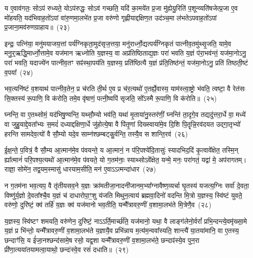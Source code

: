 य ए॒वाव॑गतः॒ सो\-ऽप॑ रुध्यते॒ यो\-ऽप॑रुद्धः॒ सो\-ऽव॑ गच्छति॒ यदि॑ का॒मये॑त प्र॒जा मु॑ह्येयु॒रिति॑ प॒शून्व्यति॑षजेत्प्र॒जा ए॒व मो॑हयति॒ यद॑भिवाह॒तो॑\-ऽपां वा॑रु॒णमा॒लभे॑त प्र॒जा वरु॑णो गृह्णीयाद्दक्षिण॒त उद॑ञ्च॒मा ल॑भते\-ऽपवाह॒तो॑\-ऽ\-पां प्र॒जाना॒मव॑रुणग्राहाय॥~(२३)\ip

{\anuvakamend[{रेतो॒ यज॑माने दधाति लो॒क ऐ॒न्द्रꣳ स॒प्तत्रिꣳ॑शच्च}]}

इन्द्रः॒ पत्नि॑या॒ मनु॑मयाजय॒त्तां पर्य॑ग्निकृता॒मुद॑सृज॒त्तया॒ मनु॑रार्ध्नो॒द्यत्पर्य॑ग्निकृतं पात्नीव॒तमु॑थ्सृ॒जति॒ यामे॒व मनु॒र्॒\mbox{}ऋद्धि॒\-मार्ध्नो॒त्तामे॒व यज॑मान ऋध्नोति य॒ज्ञस्य॒ वा अप्र॑तिष्ठिताद्य॒ज्ञः परा॑ भवति य॒ज्ञं प॑रा॒भव॑न्तं॒ यज॑मा॒नो\-ऽनु॒ परा॑ भवति॒ यदाज्ये॑न पात्नीव॒तꣳ सꣴ॑स्था॒पय॑ति य॒ज्ञस्य॒ प्रति॑ष्ठित्यै य॒ज्ञं प्र॑ति॒तिष्ठ॑न्तं॒ यज॑मा॒नो\-ऽनु॒ प्रति॑ तिष्ठती॒ष्टं व॒पया᳚~(२४)\ip

भव॒त्यनि॑ष्टं व॒शयाथ॑ पात्नीव॒तेन॒ प्र च॑रति ती॒र्थ ए॒व प्र च॑र॒त्यथो॑ ए॒तर्\mbox{}ह्ये॒वास्य॒ याम॑स्त्वा॒ष्ट्रो भ॑वति॒ त्वष्टा॒ वै रेत॑सः सि॒क्तस्य॑ रू॒पाणि॒ वि क॑रोति॒ तमे॒व वृ॑षाणं॒ पत्नी॒ष्वपि॑ सृजति॒ सो᳚\-ऽस्मै रू॒पाणि॒ वि क॑रोति॥~(२५)\ip

{\anuvakamend[{व॒पया॒ षट्त्रिꣳ॑शच्च}]}

घ्नन्ति॒ वा ए॒तथ्सोमं॒ यद॑भिषु॒ण्वन्ति॒ यथ्सौ॒म्यो भव॑ति॒ यथा॑ मृ॒ताया॑नु॒स्तर॑णीं॒ घ्नन्ति॑ ता॒दृगे॒व तद्यदु॑त्तरा॒र्धे वा॒ मध्ये॑ वा जुहु॒याद्दे॒वता᳚भ्यः स॒मदं॑ दध्याद्दक्षिणा॒र्धे जु॑होत्ये॒षा वै पि॑तृ॒णां दिख्स्वाया॑मे॒व दि॒शि पि॒तॄन्नि॒रव॑दयत उद्गा॒तृभ्यो॑ हरन्ति सामदेव॒त्यो॑ वै सौ॒म्यो यदे॒व साम्न॑श्छम्बट्कु॒र्वन्ति॒ तस्यै॒व स शान्ति॒रव॑~(२६)\ip

ई॒क्ष॒न्ते॒ प॒वित्रं॒ वै सौ॒म्य आ॒त्मान॑मे॒व प॑वयन्ते॒ य आ॒त्मानं॒ न प॑रि॒पश्ये॑दि॒तासुः॑ स्यादभिद॒दिं कृ॒त्वावे᳚क्षेत॒ तस्मि॒न् ह्या᳚त्मानं॑ परि॒पश्य॒त्यथो॑ आ॒त्मान॑मे॒व प॑वयते॒ यो ग॒तम॑नाः॒ स्याथ्सो\-ऽवे᳚क्षेत॒ यन्मे॒ मनः॒ परा॑गतं॒ यद्वा॑ मे॒ अप॑रागतम्। राज्ञा॒ सोमे॑न॒ तद्व॒यम॒स्मासु॑ धारयाम॒सीति॒ मन॑ ए॒वा\-ऽऽ\-त्मन्दा॑धार~(२७)\ip

न ग॒तम॑ना भव॒त्यप॒ वै तृ॑तीय\-सव॒ने य॒ज्ञः क्रा॑मतीजा॒नादनी॑जानम॒भ्या᳚ग्नावैष्ण॒व्यर्चा घृ॒तस्य॑ यजत्य॒ग्निः सर्वा॑ दे॒वता॒ विष्णु॑र्य॒ज्ञो दे॒वता᳚श्चै॒व य॒ज्ञं च॑ दाधारोपा॒ꣳ॒शु य॑जति मिथुन॒त्वाय॑ ब्रह्मवा॒दिनो॑ वदन्ति मि॒त्रो य॒ज्ञस्य॒ स्वि॑ष्टं युवते॒ वरु॑णो॒ दुरि॑ष्टं॒ क्व॑ तर्\mbox{}हि॑ य॒ज्ञः क्व॑ यज॑मानो भव॒तीति॒ यन्मै᳚त्रावरु॒णीं व॒शामा॒लभ॑ते मि॒त्रेणै॒व~(२८)\ip

य॒ज्ञस्य॒ स्वि॑ष्टꣳ शमयति॒ वरु॑णेन॒ दुरि॑ष्टं॒ नाऽऽर्ति॒मार्च्छ॑ति॒ यज॑मानो॒ यथा॒ वै लाङ्ग॑लेनो॒र्वरां᳚ प्रभि॒न्दन्त्ये॒वमृ॑ख्सा॒मे य॒ज्ञं प्र भि॑न्तो॒ यन्मै᳚त्रावरु॒णीं व॒शामा॒लभ॑ते य॒ज्ञायै॒व प्रभि॑न्नाय म॒त्य॑म॒न्ववा᳚स्यति॒ शान्त्यै॑ या॒तया॑मानि॒ वा ए॒तस्य॒ छन्दाꣳ॑सि॒ य ई॑जा॒नश्छन्द॑सामे॒ष रसो॒ यद्व॒शा यन्मै᳚त्रावरु॒णीं व॒शामा॒लभ॑ते॒ छन्दाꣴ॑स्ये॒व पुन॒रा प्री॑णा॒त्यया॑तयामत्वा॒याथो॒ छन्दः॑स्वे॒व रसं॑ दधाति॥~(२९)\ip

